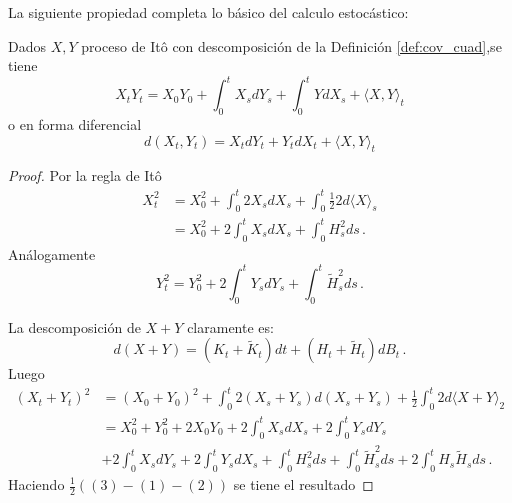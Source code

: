 La siguiente propiedad completa lo básico del calculo estocástico:
\begin{proposition}
Dados $X,Y$ proceso de It\^{o} con descomposición de la Definición \ref{def:cov_cuad},se tiene 
\begin{equation*}
    X_t Y_t = X_0 Y_0 + \int_{0}^{t} X_s dY_s + \int_{0}^{t} Y dX_s + \langle X,Y \rangle_t
\end{equation*}
o en forma diferencial 
\begin{equation*}
    d(X_t, Y_t) = X_t dY_t + Y_t dX_t + \langle X,Y \rangle_t
\end{equation*}
\end{proposition}
\begin{proof}
\gris
Por la regla de It\^{o} 
\begin{align*}
    X^2_{t} &= X^2_{0} + \int_{0}^{t} 2 X_s dX_s + \int_{0}^{t} \frac{1}{2} 2 d \langle X \rangle_s\\
            &= X^2_{0} + 2 \int_{0}^{t} X_s d X_s + \int_{0}^{t} H_s^2 ds \,.
\end{align*}
Análogamente
\begin{equation*}
    Y^2_{t} = Y^2_{0} + 2 \int_{0}^{t} Y_s d Y_s + \int_{0}^{t} \tilde{H}_s^2 ds \,.
\end{equation*}

La descomposición de $X + Y$ claramente es: 
\begin{equation*}
        d(X +Y) = (K_t + \tilde{K}_t) dt + (H_t + \tilde{H}_t) dB_t \,.
\end{equation*}
Luego 
\begin{align*}
    (X_t + Y_t)^2 & = (X_0 + Y_0)^2 + \int_{0}^{t} 2 (X_s + Y_s) d(X_s + Y_s) + \frac{1}{2} \int_{0}^{t} 2d \langle X + Y \rangle_2 \\
    &=X_0^2 + Y_0^2 + 2X_0Y_0 + 2 \int_{0}^{t} X_s dX_s + 2 \int_{0}^{t} Y_s dY_s  \\
    &+ 2 \int_{0}^{t} X_s dY_s + 2 \int_{0}^{t} Y_s dX_s + \int_{0}^{t} H_s^2 ds + \int_{0}^{t} \tilde{H}_s^2 ds + 2 \int_{0}^{t} H_s \tilde{H}_s ds \,.
\end{align*}
Haciendo $\frac{1}{2} ( (3) - (1) - (2) )$ se tiene el resultado \findem
\negro
\end{proof}

